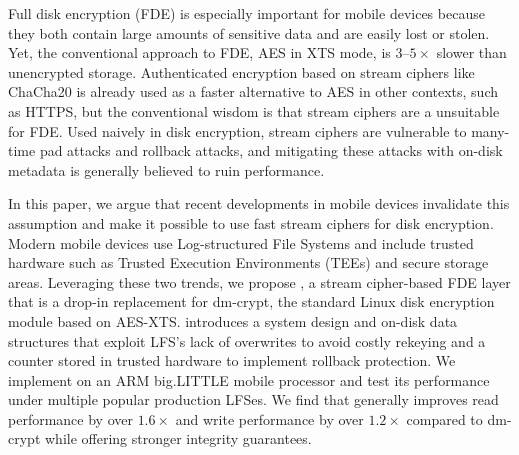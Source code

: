 \abstract
Full disk encryption (FDE) is especially important for mobile devices because they both
contain large amounts of sensitive data and are easily lost or stolen. Yet, the
conventional approach to FDE, AES in XTS mode, is 3--$5\times$ slower than unencrypted storage.
Authenticated encryption based on stream ciphers like ChaCha20 is already used as a
faster alternative to AES in other contexts, such as HTTPS, but the conventional wisdom
is that stream ciphers are a unsuitable for FDE. Used naively in disk encryption, stream
ciphers are vulnerable to many-time pad attacks and rollback attacks, and mitigating
these attacks with on-disk metadata is generally believed to ruin performance.

In this paper, we argue that recent developments in mobile devices invalidate this
assumption and make it possible to use fast stream ciphers for disk encryption. Modern
mobile devices use Log-structured File Systems and include trusted hardware such as
Trusted Execution Environments (TEEs) and secure storage areas. Leveraging these two
trends, we propose \SYSTEM{}, a stream cipher-based FDE layer that is a drop-in
replacement for dm-crypt, the standard Linux disk encryption module based on AES-XTS.
\SYSTEM{} introduces a system design and on-disk data structures that exploit LFS's lack
of overwrites to avoid costly rekeying and a counter stored in trusted hardware to
implement rollback protection. We implement \SYSTEM{} on an ARM big.LITTLE mobile
processor and test its performance under multiple popular production LFSes. We find that
\SYSTEM{} generally improves read performance by over $1.6\times$ and write performance by
over $1.2\times$ compared to dm-crypt while offering stronger integrity guarantees.
